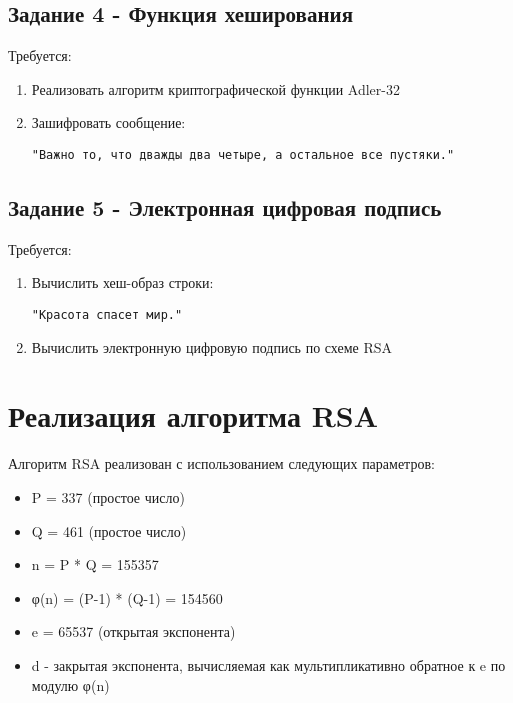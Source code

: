\documentclass[a4paper, 14pt]{extarticle}
\begin{document}
\subsection{Задание 4 - Функция хеширования}
Требуется:
\begin{enumerate}
    \item Реализовать алгоритм криптографической функции Adler-32
    \item Зашифровать сообщение:
    \begin{lstlisting}
"Важно то, что дважды два четыре, а остальное все пустяки."
    \end{lstlisting}
\end{enumerate}

\subsection{Задание 5 - Электронная цифровая подпись}
Требуется:
\begin{enumerate}
    \item Вычислить хеш-образ строки:
    \begin{lstlisting}
"Красота спасет мир."
    \end{lstlisting}
    \item Вычислить электронную цифровую подпись по схеме RSA
\end{enumerate}

\section{Реализация алгоритма RSA}
Алгоритм RSA реализован с использованием следующих параметров:
\begin{itemize}
    \item P = 337 (простое число)
    \item Q = 461 (простое число)
    \item n = P * Q = 155357
    \item φ(n) = (P-1) * (Q-1) = 154560
    \item e = 65537 (открытая экспонента)
    \item d - закрытая экспонента, вычисляемая как мультипликативно обратное к e по модулю φ(n)
\end{itemize}
\end{document}
